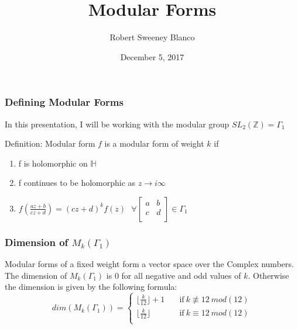 \documentclass{beamer}
\title{Modular Forms}
\author{Robert Sweeney Blanco}
\institute{Advisor: Brandon Williams}
\date{December 5, 2017}
\begin{document}
 
\frame{\titlepage}
 
\begin{frame}
\frametitle{Defining Modular Forms}
In this presentation, I will be working with the modular group $SL_2(\mathbb{Z}) = \Gamma_1$
\begin{block}{Definition: Modular form}
$f$ is a modular form of weight $k$ if 
\begin{enumerate}
\item  f is holomorphic on $\mathbb{H}$\\
\item f continues to be holomorphic as $z \longrightarrow i\infty$
\item $f(\frac{az+b}{cz+d}) = (cz+d)^k f(z) \  \ \ \forall \begin{bmatrix}
a & b \\
c & d \\
\end{bmatrix} \in \Gamma_1$
\end{enumerate}
\end{block}
\end{frame}

\begin{frame}
\frametitle{Dimension of $M_k(\Gamma_1)$}
Modular forms of a fixed weight form a vector space over the Complex numbers. The dimension of $M_k(\Gamma_1)$ is $0$ for all negative and odd values of $k$. Otherwise the dimension is given by the following formula:
\[   
dim(M_k(\Gamma_1)) = 
     \begin{cases}
       \lfloor \frac{k}{12} \rfloor + 1 & \quad \text{if} \  k \not \equiv  12 \ mod(12) \\
       \lfloor \frac{k}{12} \rfloor & \quad \text{if} \  k \equiv  12 \ mod(12) \\
     \end{cases}
\]
\end{frame}
\end{document}
